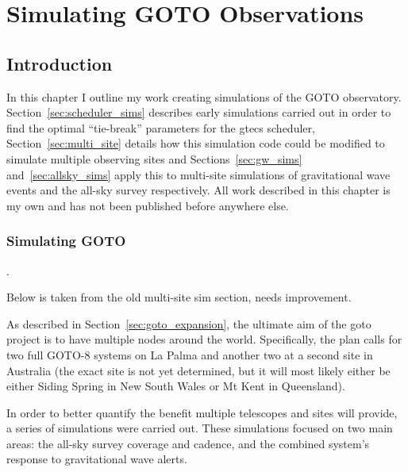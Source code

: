 \chapter{Simulating GOTO Observations}
\label{chap:sims}
\chaptoc{}


\newpage
\section{Introduction}
\label{sec:sims_intro}
\begin{colsection}


\begin{colsection}

In this chapter I outline my work creating simulations of the GOTO observatory. Section~\ref{sec:scheduler_sims} describes early simulations carried out in order to find the optimal ``tie-break'' parameters for the \gls{gtecs} scheduler, Section~\ref{sec:multi_site} details how this simulation code could be modified to simulate multiple observing sites and Sections~\ref{sec:gw_sims} and~\ref{sec:allsky_sims} apply this to multi-site simulations of gravitational wave events and the all-sky survey respectively. All work described in this chapter is my own and has not been published before anywhere else.

\end{colsection}


\subsection{Simulating GOTO}
\label{sec:goto_sims}
\begin{colsection}

.

Below is taken from the old multi-site sim section, needs improvement.

As described in Section~\ref{sec:goto_expansion}, the ultimate aim of the \gls{goto} project is to have multiple nodes around the world. Specifically, the plan calls for two full GOTO-8 systems on La Palma and another two at a second site in Australia (the exact site is not yet determined, but it will most likely either be either Siding Spring in New South Wales or Mt Kent in Queensland).

In order to better quantify the benefit multiple telescopes and sites will provide, a series of simulations were carried out. These simulations focused on two main areas: the all-sky survey coverage and cadence, and the combined system's response to gravitational wave alerts.

\end{colsection}


\end{colsection}

